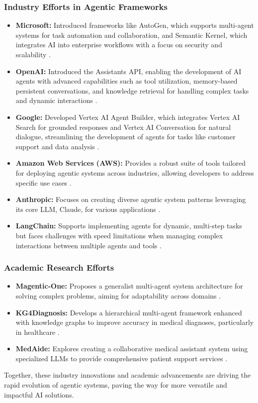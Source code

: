 \documentclass[12pt]{article}
\begin{document}
\subsubsection{Industry Efforts in Agentic Frameworks}
\begin{itemize}
    \item \textbf{Microsoft:} Introduced frameworks like AutoGen, which supports multi-agent systems for task automation and collaboration, and Semantic Kernel, which integrates AI into enterprise workflows with a focus on security and scalability \cite{microsoft_agentic}.
    \item \textbf{OpenAI:} Introduced the Assistants API, enabling the development of AI agents with advanced capabilities such as tool utilization, memory-based persistent conversations, and knowledge retrieval for handling complex tasks and dynamic interactions \cite{openai_devday_2023}.
    \item \textbf{Google:} Developed Vertex AI Agent Builder, which integrates Vertex AI Search for grounded responses and Vertex AI Conversation for natural dialogue, streamlining the development of agents for tasks like customer support and data analysis \cite{google_vertex}.
    \item \textbf{Amazon Web Services (AWS):} Provides a robust suite of tools tailored for deploying agentic systems across industries, allowing developers to address specific use cases \cite{aws_llm_agents}.
    \item \textbf{Anthropic:} Focuses on creating diverse agentic system patterns leveraging its core LLM, Claude, for various applications \cite{anthropic}.
    \item \textbf{LangChain:} Supports implementing agents for dynamic, multi-step tasks but faces challenges with speed limitations when managing complex interactions between multiple agents and tools \cite{langchain_agents}.
\end{itemize}

\subsubsection{Academic Research Efforts}
\begin{itemize}
    \item \textbf{Magentic-One:} Proposes a generalist multi-agent system architecture for solving complex problems, aiming for adaptability across domains \cite{MagenticOne2024}.
    \item \textbf{KG4Diagnosis:} Develops a hierarchical multi-agent framework enhanced with knowledge graphs to improve accuracy in medical diagnoses, particularly in healthcare \cite{KG4Diagnosis2024}.
    \item \textbf{MedAide:} Explores creating a collaborative medical assistant system using specialized LLMs to provide comprehensive patient support services \cite{MedAide2024}.
\end{itemize}
Together, these industry innovations and academic advancements are driving the rapid evolution of agentic systems, paving the way for more versatile and impactful AI solutions.
\end{document}
